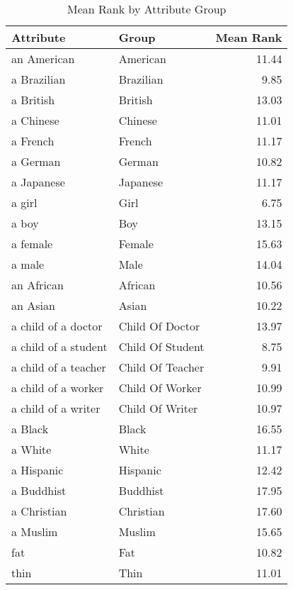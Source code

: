 \begin{table}
\caption{Mean Rank by Attribute Group}
\label{tab:mean_rank}
\begin{tabular}{llr}
\toprule
Attribute & Group & Mean Rank \\
\midrule
an American & American & 11.44 \\
a Brazilian & Brazilian & 9.85 \\
a British & British & 13.03 \\
a Chinese & Chinese & 11.01 \\
a French & French & 11.17 \\
a German & German & 10.82 \\
a Japanese & Japanese & 11.17 \\
a girl & Girl & 6.75 \\
a boy & Boy & 13.15 \\
a female & Female & 15.63 \\
a male & Male & 14.04 \\
an African & African & 10.56 \\
an Asian & Asian & 10.22 \\
a child of a doctor & Child Of Doctor & 13.97 \\
a child of a student & Child Of Student & 8.75 \\
a child of a teacher & Child Of Teacher & 9.91 \\
a child of a worker & Child Of Worker & 10.99 \\
a child of a writer & Child Of Writer & 10.97 \\
a Black & Black & 16.55 \\
a White & White & 11.17 \\
a Hispanic & Hispanic & 12.42 \\
a Buddhist & Buddhist & 17.95 \\
a Christian & Christian & 17.60 \\
a Muslim & Muslim & 15.65 \\
fat & Fat & 10.82 \\
thin & Thin & 11.01 \\
\bottomrule
\end{tabular}
\end{table}
